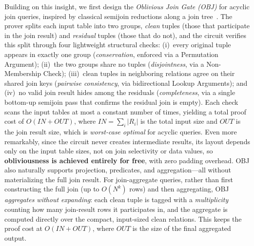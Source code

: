 \documentclass[sigconf]{acmart}
\renewcommand{\emph}[1]{\textit{#1}}
\begin{document}
Building on this insight, we first design the \emph{Oblivious Join Gate (OBJ)} for acyclic join queries, inspired by classical semijoin reductions along a join tree~\cite{yannakakis1981algorithms, beeri1983desirability}. The prover splits each input table into two groups, \emph{clean} tuples (those that participate in the join result) and \emph{residual} tuples (those that do not), and the circuit verifies this split through four lightweight structural checks: (i)~every original tuple appears in exactly one group (\emph{conservation}, enforced via a Permutation Argument); (ii)~the two groups share no tuples (\emph{disjointness}, via a Non-Membership Check); (iii)~clean tuples in neighboring relations agree on their shared join keys (\emph{pairwise consistency}, via bidirectional Lookup Arguments); and (iv)~no valid join result hides among the residuals (\emph{completeness}, via a single bottom-up semijoin pass that confirms the residual join is empty). Each check scans the input tables at most a constant number of times, yielding a total proof cost of $O(\mathit{IN} + \mathit{OUT})$, where $\mathit{IN} = \sum_i |R_i|$ is the total input size and $\mathit{OUT}$ is the join result size, which is \emph{worst-case optimal} for acyclic queries. Even more remarkably, since the circuit never creates intermediate results, its layout depends only on the input table sizes, not on join selectivity or data values, so \textbf{obliviousness is achieved entirely for free}, with zero padding overhead. OBJ also naturally supports projection, predicates, and aggregation---all without materializing the full join result. For join-aggregate queries, rather than first constructing the full join (up to $O(N^k)$ rows) and then aggregating, OBJ \emph{aggregates without expanding}: each clean tuple is tagged with a \emph{multiplicity} counting how many join-result rows it participates in, and the aggregate is computed directly over the compact, input-sized clean relations. This keeps the proof cost at $O(\mathit{IN} + \mathit{OUT})$, where $\mathit{OUT}$ is the size of the final aggregated output.
\end{document}
